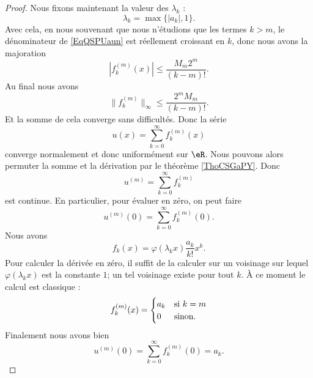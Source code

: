 \begin{proof}
    Nous fixons maintenant la valeur des \( \lambda_k\) :
    \begin{equation}
        \lambda_k=\max\{ | a_k |,1 \}.
    \end{equation}
    Avec cela, en nous souvenant que nous n'étudions que les termes \( k>m\), le dénominateur de \eqref{EqQSPUaun} est réellement croissant en \( k\), donc nous avons la majoration
    \begin{equation}
        | f^{(m)}_k(x) |\leq \frac{ M_m2^m }{ (k-m)! }.
    \end{equation}
    Au final nous avons
    \begin{equation}
        \| f_k^{(m)} \|_{\infty}\leq \frac{ 2^mM_m }{ (k-m)! }.
    \end{equation}
    Et la somme de cela converge sans difficultés. Donc la série
    \begin{equation}
        u(x)=\sum_{k=0}^{\infty}f_k^{(m)}(x)
    \end{equation}
    converge normalement et donc uniformément sur \( \eR\). Nous pouvons alors permuter la somme et la dérivation par le théorème \ref{ThoCSGaPY}. Donc
    \begin{equation}
        u^{(m)}=\sum_{k=0}^{\infty}f_k^{(m)}
    \end{equation}
    est continue. En particulier, pour évaluer en zéro, on peut faire
    \begin{equation}
        u^{(m)}(0)=\sum_{k=0}^{\infty}f_k^{(m)}(0).
    \end{equation}
    Nous avons
    \begin{equation}
        f_k(x)=\varphi(\lambda_kx)\frac{ a_k }{ k! }x^k.
    \end{equation}
    Pour calculer la dérivée en zéro, il suffit de la calculer sur un voisinage sur lequel \( \varphi(\lambda_kx)\) est la constante \( 1\); un tel voisinage existe pour tout \( k\). À ce moment le calcul est classique :
    \begin{equation}
        f_k^{(m)}(x)=\begin{cases}
            a_k    &   \text{si \( k=m\)}\\
            0    &    \text{sinon}.
        \end{cases}
    \end{equation}
    Finalement nous avons bien
    \begin{equation}
        u^{(m)}(0)=\sum_{k=0}^{\infty}f_k^{(m)}(0)=a_k.
    \end{equation}
    
\end{proof}

